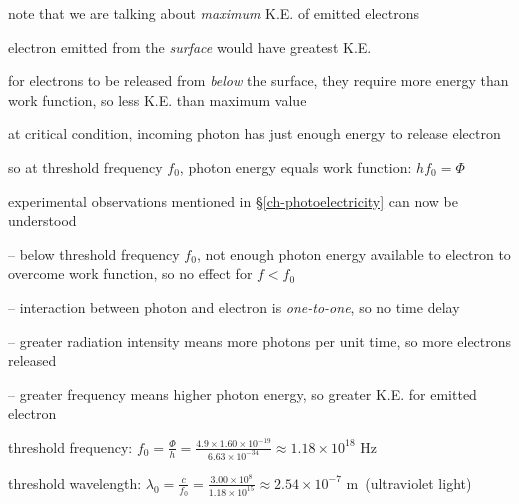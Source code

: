 \cmt note that we are talking about \emph{maximum} K.E. of emitted electrons

electron emitted from the \emph{surface} would have greatest K.E.

for electrons to be released from \emph{below} the surface, they require more energy than work function, so less K.E. than maximum value

\cmt at critical condition, incoming photon has just enough energy to release electron

so at threshold frequency $f_0$, photon energy equals work function: $\boxed{hf_0 = \Phi}$

\cmt experimental observations mentioned in \S\ref{ch-photoelectricity} can now be understood

\begin{compactitem}
	
	\item[--] below threshold frequency $f_0$, not enough photon energy available to electron to overcome work function, so no effect for $f<f_0$
	
	\item[--] interaction between photon and electron is \emph{one-to-one}, so no time delay
	
	\item[--] greater radiation intensity means more photons per unit time, so more electrons released
	
	\item[--] greater frequency means higher photon energy, so greater K.E. for emitted electron
	
\end{compactitem}



\sol threshold frequency: $f_0 = \frac{\Phi}{h} = \frac{4.9\times1.60\times10^{-19}}{6.63\times10^{-34}} \approx 1.18\times10^{18} \text{ Hz}$

threshold wavelength: $\lambda_0 = \frac{c}{f_0} = \frac{3.00\times10^8}{1.18\times10^{15}} \approx 2.54\times10^{-7} \text{ m} \,$ (ultraviolet light) \eoe



